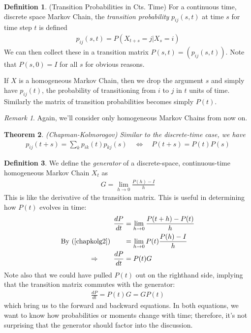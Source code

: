 \documentclass[12pt]{article}
\theoremstyle{plain}
\newtheorem{thm}{Theorem}[section]
\theoremstyle{definition}
\newtheorem{defn}[thm]{Definition}
\theoremstyle{remark}
\newtheorem*{rmk}{Remark}
\begin{document}
\begin{defn}{(Transition Probabilities in Cts. Time)}
For a continuous time, discrete space Markov Chain, the \emph{transition
probability} $p_{ij}(s,t)$ at time $s$ for time step $t$ is defined
\begin{align*}
  p_{ij}(s,t) = P(X_{t+s}=j|X_s=i)
\end{align*}
We can then collect these in a transition matrix $P(s,t) =
(p_{ij}(s,t))$. Note that $P(s,0) = I$ for all $s$ for obvious reasons.

If $X$ is a homogeneous Markov Chain, then we drop the argument $s$ and
simply have $p_{ij}(t)$, the probability of transitioning from $i$ to
$j$ in $t$ units of time. Similarly the matrix of transition
probabilities becomes simply $P(t)$.
\end{defn}

\begin{rmk}
Again, we'll consider only homogeneous Markov Chains from now on.
\end{rmk}

\begin{thm}{\emph{(Chapman-Kolmorogov)}}
Similar to the discrete-time case, we have
\begin{align}
  p_{ij}(t+s) = \sum_k p_{ik}(t) p_{kj}(s)
  \quad \Leftrightarrow \quad
  P(t+s) = P(t)P(s)
  \label{chapkolg2}
\end{align}
\end{thm}

\begin{defn}
We define the \emph{generator} of a discrete-space, continuous-time
homogeneous Markov Chain $X_t$ as
\begin{align*}
  G = \lim_{h\rightarrow0} \frac{P(h)-I}{h}
\end{align*}
This is like the derivative of the transition matrix. This is useful in
determining how $P(t)$ evolves in time:
\begin{align*}
  \frac{dP}{dt}
  &= \lim_{h\rightarrow0} \frac{P(t+h)-P(t)}{h}\\
  \text{By~(\ref{chapkolg2})}\qquad
  &= \lim_{h\rightarrow0} P(t) \frac{P(h)-I}{h}\\
  \Rightarrow\qquad
  \frac{dP}{dt}
  &= P(t) G
\end{align*}
Note also that we could have pulled $P(t)$ out on the righthand side,
implying that the transition matrix commutes with the generator:
\begin{align*}
  \frac{dP}{dt}
  = P(t) G
  = GP(t)
\end{align*}
which bring us to the forward and backward equations. In both equations,
we want to know how probabilities or moments change with time;
therefore, it's not surprising that the generator should factor into the
discussion.
\end{defn}
\end{document}
